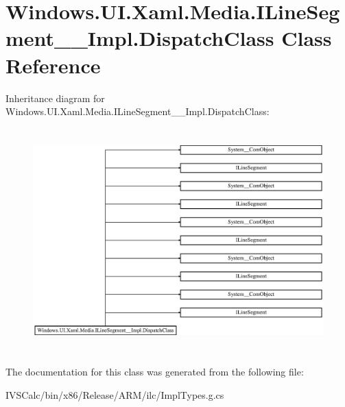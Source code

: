 \hypertarget{class_windows_1_1_u_i_1_1_xaml_1_1_media_1_1_i_line_segment_____impl_1_1_dispatch_class}{}\section{Windows.\+U\+I.\+Xaml.\+Media.\+I\+Line\+Segment\+\_\+\+\_\+\+Impl.\+Dispatch\+Class Class Reference}
\label{class_windows_1_1_u_i_1_1_xaml_1_1_media_1_1_i_line_segment_____impl_1_1_dispatch_class}
Inheritance diagram for Windows.\+U\+I.\+Xaml.\+Media.\+I\+Line\+Segment\+\_\+\+\_\+\+Impl.\+Dispatch\+Class\+:\begin{figure}[H]
\begin{center}
\leavevmode
\includegraphics[height=8.676057cm]{class_windows_1_1_u_i_1_1_xaml_1_1_media_1_1_i_line_segment_____impl_1_1_dispatch_class}
\end{center}
\end{figure}


The documentation for this class was generated from the following file\+:\begin{DoxyCompactItemize}
\item 
I\+V\+S\+Calc/bin/x86/\+Release/\+A\+R\+M/ilc/Impl\+Types.\+g.\+cs\end{DoxyCompactItemize}

